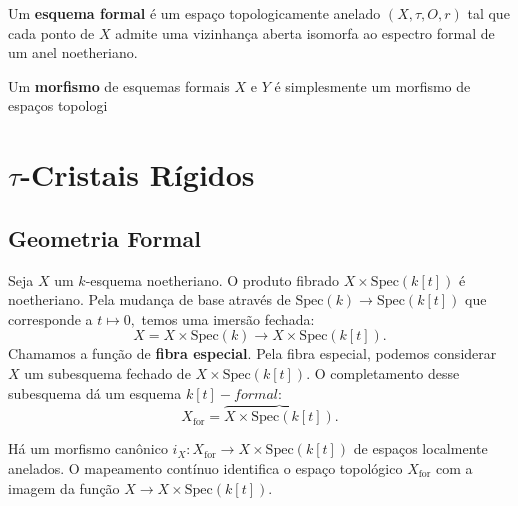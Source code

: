 \documentclass[11pt,twoside,a4paper]{book}
\begin{document}
\begin{definicao}
Um \textbf{esquema formal} é um espaço topologicamente anelado $(X,\tau,O,r)$ tal que cada ponto de $X$ admite uma vizinhança aberta isomorfa ao espectro formal de um anel noetheriano.
\end{definicao}

\begin{definicao}
Um \textbf{morfismo} de esquemas formais $X$ e $Y$ é simplesmente um morfismo de espaços topologi
\end{definicao}

\chapter{$\tau$-Cristais Rígidos}

\section{Geometria Formal}

\begin{definicao}
Seja $X$ um $k$-esquema noetheriano. O produto fibrado $X\times\mathrm{Spec}(k[t])$ é noetheriano. Pela mudança de base através de $\mathrm{Spec}(k)\rightarrow\mathrm{Spec}(k[t])$ que corresponde a $t\mapsto 0,$ temos uma imersão fechada:
\[
X=X\times\mathrm{Spec}(k)\rightarrow X\times\mathrm{Spec}(k[t]).
\]
Chamamos a função de \textbf{fibra especial}. Pela fibra especial, podemos considerar $X$ um subesquema fechado de $X\times\mathrm{Spec}(k[t]).$ O completamento desse subesquema dá um esquema $k[t]-formal$:
\[
X_\mathrm{for}=\overbrace{X\times\mathrm{Spec}(k[t])}.
\]
\end{definicao}

\begin{lema}
Há um morfismo canônico $i_X:X_{\mathrm{for}}\rightarrow X\times\mathrm{Spec}(k[t])$ de espaços localmente anelados. O mapeamento contínuo identifica o espaço topológico $X_\mathrm{for}$ com a imagem da função $X\rightarrow X\times\mathrm{Spec}(k[t]).$
\end{lema}
\end{document}
